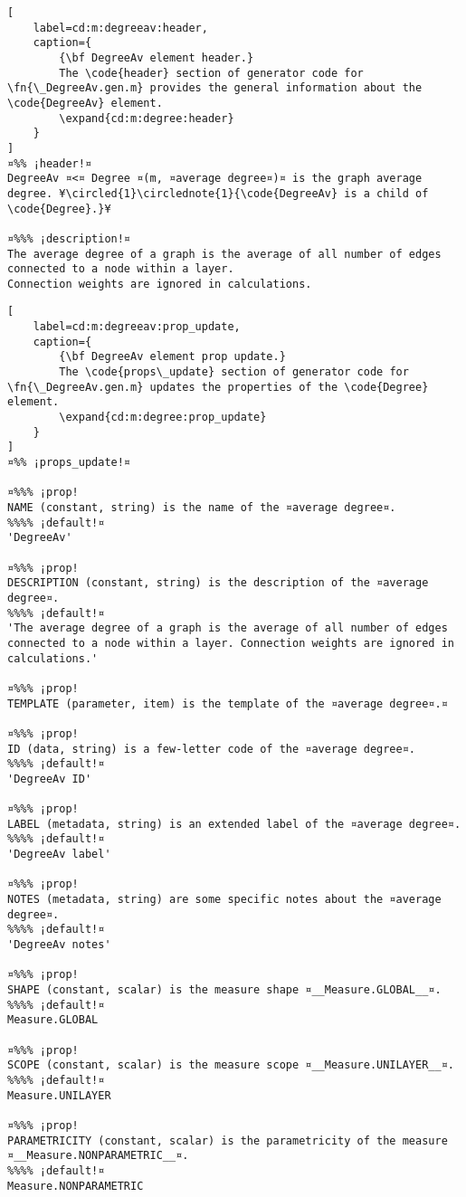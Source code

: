 \documentclass{tufte-handout}
\begin{document}
\begin{lstlisting}[
	label=cd:m:degreeav:header,
	caption={
		{\bf DegreeAv element header.}
		The \code{header} section of generator code for \fn{\_DegreeAv.gen.m} provides the general information about the \code{DegreeAv} element.
		\expand{cd:m:degree:header}
	}
]
¤%% ¡header!¤
DegreeAv ¤<¤ Degree ¤(m, ¤average degree¤)¤ is the graph average degree. ¥\circled{1}\circlednote{1}{\code{DegreeAv} is a child of \code{Degree}.}¥

¤%%% ¡description!¤
The average degree of a graph is the average of all number of edges connected to a node within a layer. 
Connection weights are ignored in calculations.
\end{lstlisting}

\begin{lstlisting}[
	label=cd:m:degreeav:prop_update,
	caption={
		{\bf DegreeAv element prop update.}
		The \code{props\_update} section of generator code for \fn{\_DegreeAv.gen.m} updates the properties of the \code{Degree} element.
		\expand{cd:m:degree:prop_update}
	}
]
¤%% ¡props_update!¤

¤%%% ¡prop!
NAME (constant, string) is the name of the ¤average degree¤.
%%%% ¡default!¤
'DegreeAv'

¤%%% ¡prop!
DESCRIPTION (constant, string) is the description of the ¤average degree¤.
%%%% ¡default!¤
'The average degree of a graph is the average of all number of edges connected to a node within a layer. Connection weights are ignored in calculations.'

¤%%% ¡prop!
TEMPLATE (parameter, item) is the template of the ¤average degree¤.¤

¤%%% ¡prop!
ID (data, string) is a few-letter code of the ¤average degree¤.
%%%% ¡default!¤
'DegreeAv ID'

¤%%% ¡prop!
LABEL (metadata, string) is an extended label of the ¤average degree¤.
%%%% ¡default!¤
'DegreeAv label'

¤%%% ¡prop!
NOTES (metadata, string) are some specific notes about the ¤average degree¤.
%%%% ¡default!¤
'DegreeAv notes'

¤%%% ¡prop!
SHAPE (constant, scalar) is the measure shape ¤__Measure.GLOBAL__¤.
%%%% ¡default!¤
Measure.GLOBAL

¤%%% ¡prop!
SCOPE (constant, scalar) is the measure scope ¤__Measure.UNILAYER__¤.
%%%% ¡default!¤
Measure.UNILAYER

¤%%% ¡prop!
PARAMETRICITY (constant, scalar) is the parametricity of the measure ¤__Measure.NONPARAMETRIC__¤.
%%%% ¡default!¤
Measure.NONPARAMETRIC


\end{lstlisting}
\end{document}
